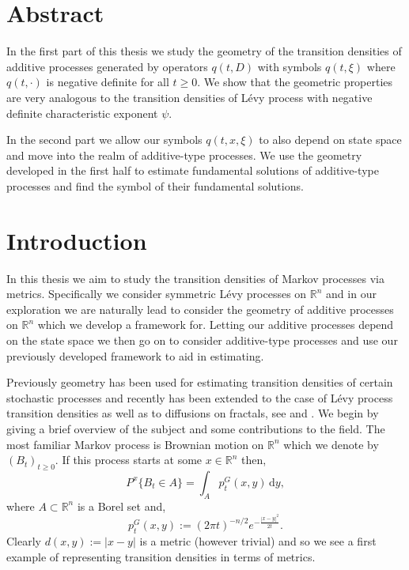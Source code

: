 \documentclass[a4paper, 12pt]{report}
\theoremstyle{cor}
\theoremstyle{remark}
\theoremstyle{definition}
\begin{document}
\newpage

\chapter*{Abstract}

In the first part of this thesis we study the geometry of the transition densities of additive processes generated by operators $q(t, D)$ with symbols $q(t, \xi)$ where $q(t, \cdot)$ is negative definite for all $t \ge 0$.  We show that the geometric properties are very analogous to the transition densities of L\'evy process with negative definite characteristic exponent $\psi$.

In the second part we allow our symbols $q(t, x, \xi)$ to also depend on state space and move into the realm of additive-type processes.  We use the geometry developed in the first half to estimate fundamental solutions of additive-type processes and find the symbol of their fundamental solutions.

\null\newpage

\hspace{0.5cm}

\newpage


\tableofcontents

\chapter*{Introduction}

In this thesis we aim to study the transition densities of Markov processes via metrics.  Specifically we consider symmetric L\'evy processes on $\mathbb{R}^n$ and in our exploration we are naturally lead to consider the geometry of additive processes on $\mathbb{R}^n$ which we develop a framework for.  Letting our additive processes depend on the state space we then go on to consider additive-type processes and use our previously developed framework to aid in estimating.

Previously geometry has been used for estimating transition densities of certain stochastic processes and recently has been extended to the case of L\'evy process transition densities as well as to diffusions on fractals, see \cite{m-stableEstimate} and \cite{45in8}.  We begin by giving a brief overview of the subject and some contributions to the field.  The most familiar Markov process is Brownian motion on $\mathbb{R}^n$ which we denote by $(B_t)_{t \ge 0}$.  If this process starts at some $x \in \mathbb{R}^n$ then,
$$
P^x\{B_t \in A\} = \int_Ap_t^G(x, y)\,\mathrm{d}y,
$$
where $A \subset \mathbb{R}^n$ is a Borel set and,
$$
p_t^G(x, y) := (2\pi t)^{-n/2}e^{-\frac{|x - y|^2}{2t}}.
$$
Clearly $d(x, y) := |x - y|$ is a metric (however trivial) and so we see a first example of representing transition densities in terms of metrics.
\end{document}
